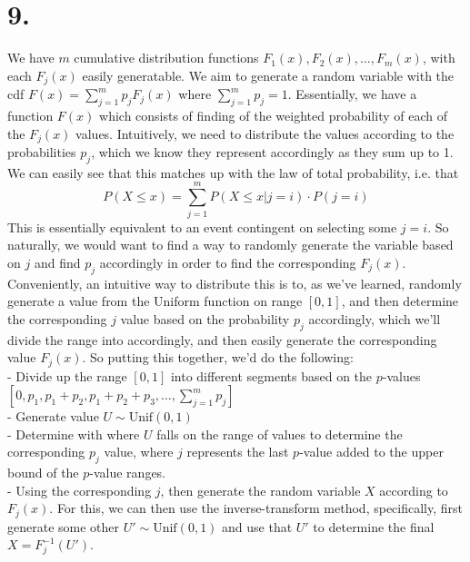 \documentclass{article}
\begin{document}
{\Large 

\section*{9.}

We have \(m\) cumulative distribution functions \(F_1(x), F_2(x), \dots, F_m(x)\), with each \(F_j(x)\) easily generatable. We aim to generate a random variable with the cdf \(F(x) = \sum_{j=1}^{m} p_j F_j(x)\) where \(\sum_{j=1}^{m} p_j = 1\). Essentially, we have a function \(F(x)\) which consists of finding of the weighted probability of each of the \(F_j(x)\) values. Intuitively, we need to distribute the values according to the probabilities \(p_j\), which we know they represent accordingly as they sum up to 1. We can easily see that this matches up with the law of total probability, i.e. that 
\[
  P(X \leq x) = \sum_{j=1}^{m} P(X \leq x | j=i) \cdot P(j=i)
\]
This is essentially equivalent to an event contingent on selecting some \(j = i\). So naturally, we would want to find a way to randomly generate the variable based on \(j\) and find \(p_j\) accordingly in order to find the corresponding \(F_j(x)\). Conveniently, an intuitive way to distribute this is to, as we've learned, randomly generate a value from the Uniform function on range \([0, 1]\), and then determine the corresponding \(j\) value based on the probability \(p_j\) accordingly, which we'll divide the range into accordingly, and then easily generate the corresponding value \(F_j(x)\). So putting this together, we'd do the following: \\
- Divide up the range \([0, 1]\) into different segments based on the \(p\)-values \([0, p_1, p_1 + p_2, p_1 + p_2 + p_3, \dots, \sum_{j=1}^m p_j]\) \\ 
- Generate value \(U \sim \text{Unif}(0, 1)\) \\
- Determine with where \(U\) falls on the range of values to determine the corresponding \(p_j\) value, where \(j\) represents the last \(p\)-value added to the upper bound of the \(p\)-value ranges. \\
- Using the corresponding \(j\), then generate the random variable \(X\) according to \(F_j(x)\). For this, we can then use the inverse-transform method, specifically, first generate some other \(U' \sim \text{Unif}(0, 1)\) and use that \(U'\) to determine the final \(X = F_j^{-1} (U')\).

}
\end{document}
